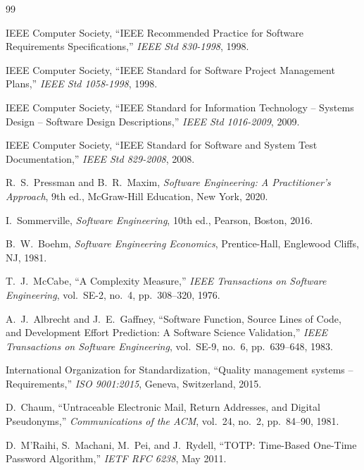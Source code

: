 \documentclass[12pt,a4paper,oneside]{report}
\begin{document}
\begin{thebibliography}{99}

IEEE Computer Society, ``IEEE Recommended Practice for Software Requirements Specifications,'' \emph{IEEE Std 830-1998}, 1998.

IEEE Computer Society, ``IEEE Standard for Software Project Management Plans,'' \emph{IEEE Std 1058-1998}, 1998.

IEEE Computer Society, ``IEEE Standard for Information Technology -- Systems Design -- Software Design Descriptions,'' \emph{IEEE Std 1016-2009}, 2009.

IEEE Computer Society, ``IEEE Standard for Software and System Test Documentation,'' \emph{IEEE Std 829-2008}, 2008.

R.~S.~Pressman and B.~R.~Maxim, \emph{Software Engineering: A Practitioner's Approach}, 9th ed., McGraw-Hill Education, New York, 2020.

I.~Sommerville, \emph{Software Engineering}, 10th ed., Pearson, Boston, 2016.

B.~W.~Boehm, \emph{Software Engineering Economics}, Prentice-Hall, Englewood Cliffs, NJ, 1981.

T.~J.~McCabe, ``A Complexity Measure,'' \emph{IEEE Transactions on Software Engineering}, vol.~SE-2, no.~4, pp.~308--320, 1976.

A.~J.~Albrecht and J.~E.~Gaffney, ``Software Function, Source Lines of Code, and Development Effort Prediction: A Software Science Validation,'' \emph{IEEE Transactions on Software Engineering}, vol.~SE-9, no.~6, pp.~639--648, 1983.

International Organization for Standardization, ``Quality management systems -- Requirements,'' \emph{ISO 9001:2015}, Geneva, Switzerland, 2015.

D.~Chaum, ``Untraceable Electronic Mail, Return Addresses, and Digital Pseudonyms,'' \emph{Communications of the ACM}, vol.~24, no.~2, pp.~84--90, 1981.

D.~M'Raihi, S.~Machani, M.~Pei, and J.~Rydell, ``TOTP: Time-Based One-Time Password Algorithm,'' \emph{IETF RFC 6238}, May 2011.

\end{thebibliography}
\end{document}
